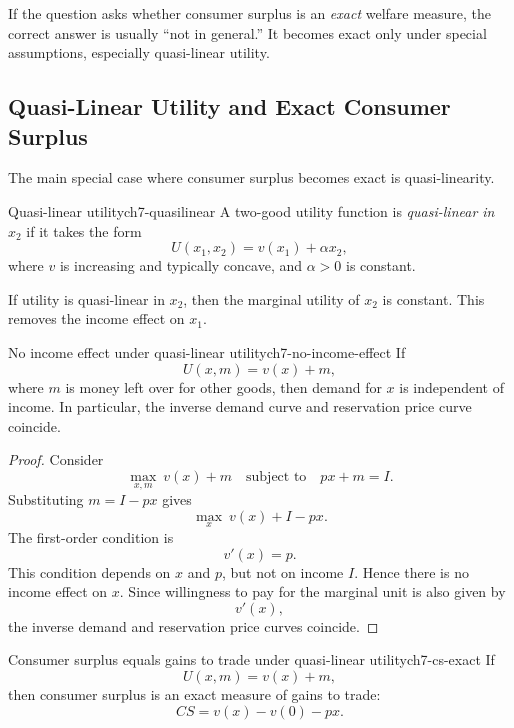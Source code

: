 \begin{examtip}
If the question asks whether consumer surplus is an \emph{exact} welfare measure, the correct answer is usually ``not in general.'' It becomes exact only under special assumptions, especially quasi-linear utility.
\end{examtip}

\subsection{Quasi-Linear Utility and Exact Consumer Surplus}

The main special case where consumer surplus becomes exact is quasi-linearity.

\begin{definition}{Quasi-linear utility}{ch7-quasilinear}
A two-good utility function is \emph{quasi-linear in $x_2$} if it takes the form
\[
U(x_1,x_2)=v(x_1)+\alpha x_2,
\]
where $v$ is increasing and typically concave, and $\alpha>0$ is constant.
\end{definition}

If utility is quasi-linear in $x_2$, then the marginal utility of $x_2$ is constant. This removes the income effect on $x_1$.

\begin{theorem}{No income effect under quasi-linear utility}{ch7-no-income-effect}
If
\[
U(x,m)=v(x)+m,
\]
where $m$ is money left over for other goods, then demand for $x$ is independent of income. In particular, the inverse demand curve and reservation price curve coincide.
\end{theorem}

\begin{proof}
Consider
\[
\max_{x,m} \ v(x)+m
\quad \text{subject to} \quad
px+m=I.
\]
Substituting $m=I-px$ gives
\[
\max_x \ v(x)+I-px.
\]
The first-order condition is
\[
v'(x)=p.
\]
This condition depends on $x$ and $p$, but not on income $I$. Hence there is no income effect on $x$. Since willingness to pay for the marginal unit is also given by
\[
v'(x),
\]
the inverse demand and reservation price curves coincide.
\end{proof}

\begin{theorem}{Consumer surplus equals gains to trade under quasi-linear utility}{ch7-cs-exact}
If
\[
U(x,m)=v(x)+m,
\]
then consumer surplus is an exact measure of gains to trade:
\[
CS = v(x)-v(0)-px.
\]
\end{theorem}

